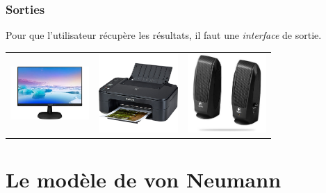 \documentclass[svgnames,11pt]{beamer}
\begin{document}
\begin{frame}
    \frametitle{Sorties}

Pour que l'utilisateur récupère les résultats, il faut une \emph{interface} de sortie.
\begin{center}
    \begin{tabular}{ccc}
        \includegraphics[width=3cm]{ressources/ecran.jpg}&
        \includegraphics[width=3cm]{ressources/imprimante.jpg}&
        \includegraphics[width=3cm]{ressources/enceinte.jpg}\\
    \end{tabular}
\end{center}

\end{frame}
\section{Le modèle de von Neumann}
\end{document}
